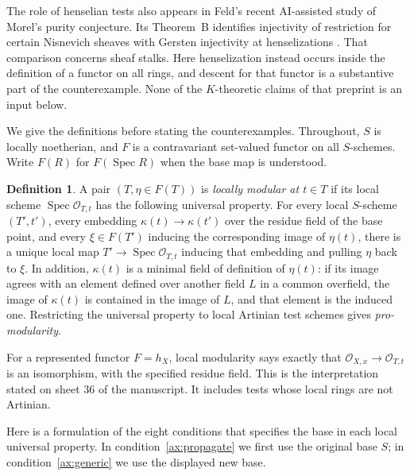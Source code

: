 \documentclass[11pt]{article}
\theoremstyle{definition}\newtheorem{definition}[theorem]{Definition}
\theoremstyle{remark}\newtheorem{remark}[theorem]{Remark}
\newcommand{\OO}{\mathcal O}
\newcommand{\Spec}{\operatorname{Spec}}
\begin{document}
The role of henselian tests also appears in Feld's recent AI-assisted study of Morel's purity conjecture. Its Theorem~B identifies injectivity of restriction for certain Nisnevich sheaves with Gersten injectivity at henselizations \cite[Theorem~B, p.~2]{FeldPurity}. That comparison concerns sheaf stalks. Here henselization instead occurs inside the definition of a functor on all rings, and descent for that functor is a substantive part of the counterexample. None of the $K$-theoretic claims of that preprint is an input below.

We give the definitions before stating the counterexamples. Throughout, $S$ is locally noetherian, and $F$ is a contravariant set-valued functor on all $S$-schemes. Write $F(R)$ for $F(\Spec R)$ when the base map is understood.

\begin{definition}\label{def:modular}
A pair $(T,\eta\in F(T))$ is \emph{locally modular at $t\in T$} if its local scheme $\Spec\OO_{T,t}$ has the following universal property. For every local $S$-scheme $(T',t')$, every embedding $\kappa(t)\to\kappa(t')$ over the residue field of the base point, and every $\xi\in F(T')$ inducing the corresponding image of $\eta(t)$, there is a unique local map $T'\to\Spec\OO_{T,t}$ inducing that embedding and pulling $\eta$ back to $\xi$.
In addition, $\kappa(t)$ is a minimal field of definition of $\eta(t)$: if its image agrees with an element defined over another field $L$ in a common overfield, the image of $\kappa(t)$ is contained in the image of $L$, and that element is the induced one. Restricting the universal property to local Artinian test schemes gives \emph{pro-modularity}.
\end{definition}

For a represented functor $F=h_X$, local modularity says exactly that $\OO_{X,x}\to\OO_{T,t}$ is an isomorphism, with the specified residue field. This is the interpretation stated on sheet 36 of the manuscript. It includes tests whose local rings are not Artinian.

Here is a formulation of the eight conditions that specifies the base in each local universal property. In condition~\ref{ax:propagate} we first use the original base $S$; in condition~\ref{ax:generic} we use the displayed new base.
\end{document}
